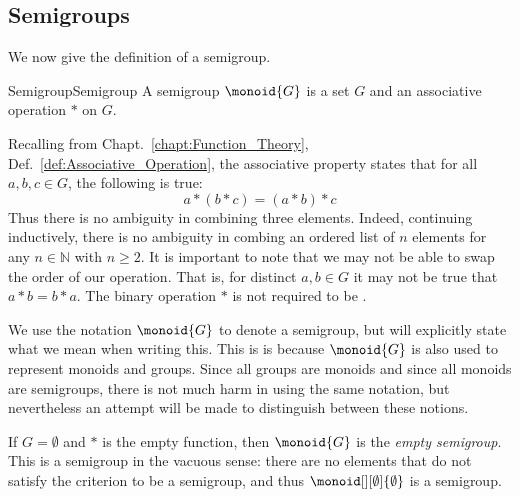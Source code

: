     \subsection{Semigroups}
        We now give the definition of a semigroup.
        \begin{fdefinition}{Semigroup}{Semigroup}
            A \gls{semigroup} $\monoid{G}$ is a set $G$ and an
            \gls{associative operation} $*$ on $G$.
        \end{fdefinition}
        Recalling from Chapt.~\ref{chapt:Function_Theory},
        Def.~\ref{def:Associative_Operation}, the associative property states
        that for all $a,b,c\in{G}$, the following is true:
        \begin{equation}
            a*(b*c)=(a*b)*c
        \end{equation}
        Thus there is no ambiguity in combining three elements. Indeed,
        continuing inductively, there is no ambiguity in combing an ordered list
        of $n$ elements for any $n\in\mathbb{N}$ with $n\geq{2}$. It is
        important to note that we may not be able to swap the order of our
        operation. That is, for distinct $a,b\in{G}$ it may not be true that
        $a*b=b*a$. The binary operation $*$ is not required to be
        .
        \par\hfill\par
        We use the notation $\monoid{G}$ to denote a semigroup, but will
        explicitly state what we mean when writing this. This is is because
        $\monoid{G}$ is also used to represent monoids and groups. Since all
        groups are monoids and since all monoids are semigroups, there is not
        much harm in using the same notation, but nevertheless an attempt will
        be made to distinguish between these notions.
        \begin{example}
            If $G=\emptyset$ and $*$ is the empty function, then $\monoid{G}$ is
            the \textit{empty semigroup}. This
            is a semigroup in the vacuous sense: there are no elements that do
            not satisfy the criterion to be a semigroup, and thus
            $\monoid[][\emptyset]{\emptyset}$ is a semigroup.
        \end{example}

